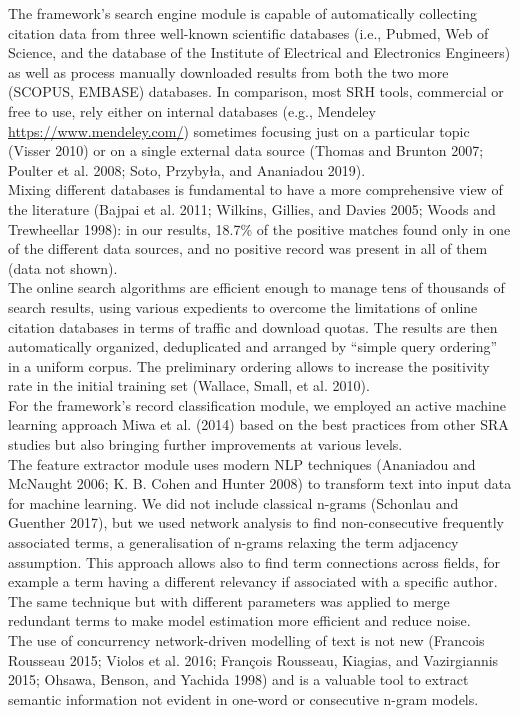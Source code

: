 \documentclass{article}
\begin{document}
The framework's search engine module is capable of automatically
collecting citation data from three well-known scientific databases
(i.e., Pubmed, Web of Science, and the database of the Institute of
Electrical and Electronics Engineers) as well as process manually
downloaded results from both the two more (SCOPUS, EMBASE) databases. In
comparison, most SRH tools, commercial or free to use, rely either on
internal databases (e.g., Mendeley \url{https://www.mendeley.com/})
sometimes focusing just on a particular topic (Visser 2010) or on a
single external data source (Thomas and Brunton 2007; Poulter et al.
2008; Soto, Przybyła, and Ananiadou 2019).\\
Mixing different databases is fundamental to have a more comprehensive
view of the literature (Bajpai et al. 2011; Wilkins, Gillies, and Davies
2005; Woods and Trewheellar 1998): in our results, 18.7\% of the
positive matches found only in one of the different data sources, and no
positive record was present in all of them (data not shown).\\
The online search algorithms are efficient enough to manage tens of
thousands of search results, using various expedients to overcome the
limitations of online citation databases in terms of traffic and
download quotas. The results are then automatically organized,
deduplicated and arranged by ``simple query ordering'' in a uniform
corpus. The preliminary ordering allows to increase the positivity rate
in the initial training set (Wallace, Small, et al. 2010).\\

For the framework's record classification module, we employed an active
machine learning approach Miwa et al. (2014) based on the best practices
from other SRA studies but also bringing further improvements at various
levels.\\
The feature extractor module uses modern NLP techniques (Ananiadou and
McNaught 2006; K. B. Cohen and Hunter 2008) to transform text into input
data for machine learning. We did not include classical n-grams
(Schonlau and Guenther 2017), but we used network analysis to find
non-consecutive frequently associated terms, a generalisation of n-grams
relaxing the term adjacency assumption. This approach allows also to
find term connections across fields, for example a term having a
different relevancy if associated with a specific author. The same
technique but with different parameters was applied to merge redundant
terms to make model estimation more efficient and reduce noise.\\
The use of concurrency network-driven modelling of text is not new
(Francois Rousseau 2015; Violos et al. 2016; François Rousseau, Kiagias,
and Vazirgiannis 2015; Ohsawa, Benson, and Yachida 1998) and is a
valuable tool to extract semantic information not evident in one-word or
consecutive n-gram models.\\
\end{document}
